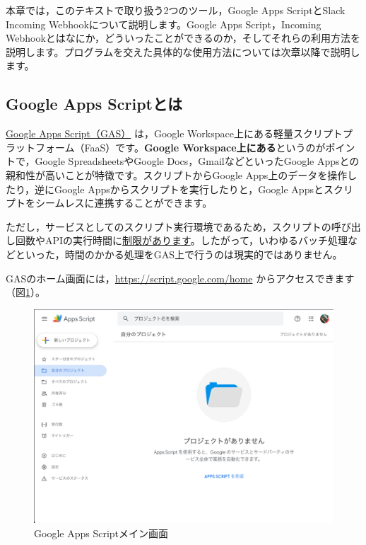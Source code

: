 \documentclass[uplatex,a4j]{jsarticle}
\begin{document}
本章では，このテキストで取り扱う2つのツール，Google Apps ScriptとSlack Incoming Webhookについて説明します。Google Apps Script，Incoming Webhookとはなにか，どういったことができるのか，そしてそれらの利用方法を説明します。プログラムを交えた具体的な使用方法については次章以降で説明します。

\subsection{Google Apps Scriptとは}
\label{subsec:About GAS}

\href{https://developers.google.com/apps-script/}{Google Apps Script（GAS）} は，Google Workspace上にある軽量スクリプトプラットフォーム（FaaS）です。\textbf{Google Workspace上にある}というのがポイントで，Google SpreadsheetsやGoogle Docs，GmailなどといったGoogle Appsとの親和性が高いことが特徴です。スクリプトからGoogle Apps上のデータを操作したり，逆にGoogle Appsからスクリプトを実行したりと，Google Appsとスクリプトをシームレスに連携することができます。

ただし，サービスとしてのスクリプト実行環境であるため，スクリプトの呼び出し回数やAPIの実行時間に\href{https://developers.google.com/apps-script/guides/services/quotas}{制限があります}。したがって，いわゆるバッチ処理などといった，時間のかかる処理をGAS上で行うのは現実的ではありません。


GASのホーム画面には，\href{https://script.google.com/home}{https://script.google.com/home} からアクセスできます（図\ref{fig:gas_main}）。
\begin{figure}[H]
 \centering
 \includegraphics[keepaspectratio, scale=0.4]{images/gas_main.png}
 \caption{Google Apps Scriptメイン画面}
 \label{fig:gas_main}
\end{figure}
\end{document}
